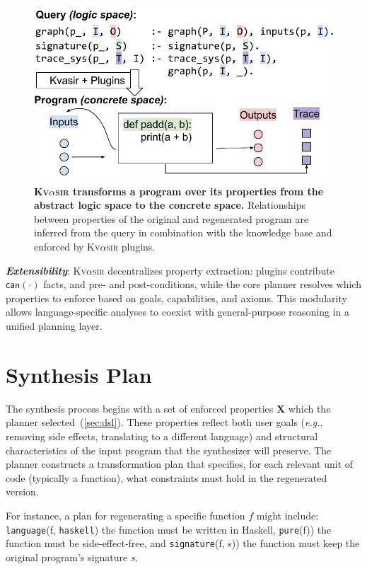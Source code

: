 \documentclass[nonacm,sigplan,review]{acmart}
\def\eg{{\em e.g.}, }
\newcommand{\sys}{{\scshape Kv{$\alpha$}sir}\xspace}
\newcommand{\heading}[1]{\vspace{2pt}\noindent\textbf{\emph{#1}}:\enspace}
\begin{document}
\begin{figure}[t]
\centering
  \includegraphics[width=.9\columnwidth]{figs/kvasir_logic-space.pdf}
  \caption{\textbf{\sys transforms a program over its properties from the abstract logic space to the concrete space.}
  Relationships between properties of the original and regenerated program are inferred 
  from the query in combination with the knowledge base and enforced by \sys plugins.
  }
  \label{fig:logic-to-concrete}
\end{figure}


\heading{Extensibility}
\sys decentralizes property extraction: plugins contribute $\mathsf{can}(\cdot)$ facts, and pre- and post-conditions, while the core planner resolves which properties to enforce based on goals, capabilities, and axioms.
This modularity allows language-specific analyses to coexist with general-purpose reasoning in a unified planning layer.

\section{Synthesis Plan}
\label{sec:synthesis}

The synthesis process begins with a set of enforced properties $\mathbf{X}$
which the planner selected~(\cref{sec:dsl}).
These properties
reflect both user goals (\eg removing side effects, translating to a
different language) and structural characteristics of the input program that
the synthesizer will preserve.
The planner constructs a transformation plan that
specifies, for each relevant unit of code (typically a function), what
constraints must hold in the regenerated version.

For instance, a plan for regenerating a specific function $f$ might include:
\texttt{language}(f, \texttt{haskell}) the function must be written in Haskell, 
\texttt{pure}(f)) the function must be side-effect-free, and 
\texttt{signature}(f, s)) the function must keep the original program's signature $s$.
\end{document}

